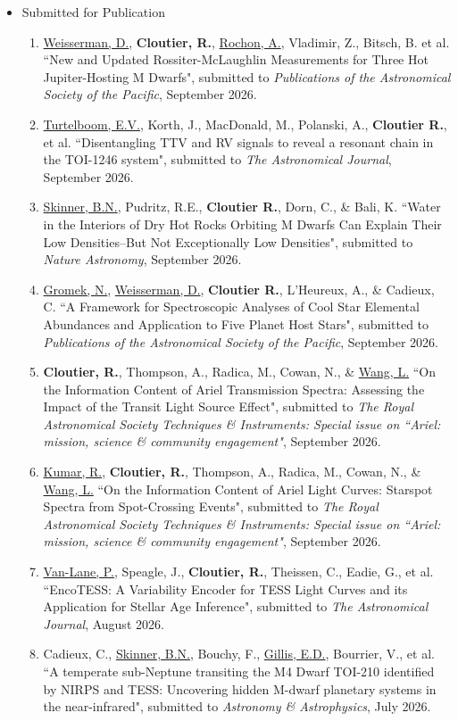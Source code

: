 \documentclass[12pt]{article}
\begin{document}
\begin{itemize}
\item Submitted for Publication
\begin{enumerate}
\item \underline{Weisserman, D.}, {\bf Cloutier, R.}, \underline{Rochon, A.}, Vladimir, Z., Bitsch, B. et al. ``New and Updated Rossiter-McLaughlin Measurements for Three Hot Jupiter-Hosting M Dwarfs", submitted to {\it Publications of the Astronomical Society of the Pacific}, September 2026.
\item \underline{Turtelboom, E.V.}, Korth, J., MacDonald, M., Polanski, A., {\bf Cloutier R.}, et al. ``Disentangling TTV and RV signals to reveal a resonant chain in the TOI-1246 system", submitted to {\it The Astronomical Journal}, September 2026.
\item \underline{Skinner, B.N.}, Pudritz, R.E., {\bf Cloutier R.}, Dorn, C., \& Bali, K. ``Water in the Interiors of Dry Hot Rocks Orbiting M Dwarfs Can Explain Their Low Densities--But Not Exceptionally Low Densities", submitted to {\it Nature Astronomy}, September 2026.
\item \underline{Gromek, N.}, \underline{Weisserman, D.}, {\bf Cloutier R.}, L'Heureux, A., \& Cadieux, C. ``A Framework for Spectroscopic Analyses of Cool Star Elemental Abundances and Application to Five Planet Host Stars", submitted to {\it Publications of the Astronomical Society of the Pacific}, September 2026.
\item {\bf Cloutier, R.}, Thompson, A., Radica, M., Cowan, N., \& \underline{Wang, L.} ``On the Information Content of Ariel Transmission Spectra: Assessing the Impact of the Transit Light Source Effect", submitted to {\it The Royal Astronomical Society Techniques \& Instruments: Special issue on ``Ariel: mission, science \& community engagement"}, September 2026.
\item \underline{Kumar, R.}, {\bf Cloutier, R.}, Thompson, A., Radica, M., Cowan, N., \& \underline{Wang, L.} ``On the Information Content of Ariel Light Curves: Starspot Spectra from
Spot-Crossing Events", submitted to {\it The Royal Astronomical Society Techniques \& Instruments: Special issue on ``Ariel: mission, science \& community engagement"}, September 2026.
\item \underline{Van-Lane, P.}, Speagle, J., {\bf Cloutier, R.}, Theissen, C., Eadie, G., et al. ``EncoTESS: A Variability Encoder for TESS Light Curves and its Application for Stellar Age Inference", submitted to {\it The Astronomical Journal}, August 2026.
\item Cadieux, C., \underline{Skinner, B.N.}, Bouchy, F., \underline{Gillis, E.D.}, Bourrier, V., et al. ``A temperate sub-Neptune transiting the M4 Dwarf TOI-210 identified by NIRPS and TESS: Uncovering hidden M-dwarf planetary systems in the near-infrared", submitted to {\it Astronomy \& Astrophysics}, July 2026.

\end{enumerate}
\end{itemize}
\end{document}
